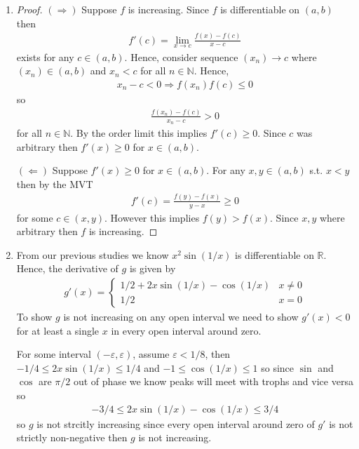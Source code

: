 \begin{enumerate}[label=(\alph*)]
    \item 
    \begin{proof}
        $(\Rightarrow)$ Suppose $f$ is increasing. 
        Since $f$ is differentiable on $(a,b)$ then 
        \begin{align*}
            f'(c) = \lim_{x\rightarrow c} \frac{f(x)-f(c)}{x-c}
        \end{align*}
        exists for any $c\in (a,b)$.
        Hence, consider sequence $(x_n)\rightarrow c$ where 
        $(x_n)\in (a,b)$ and $x_n<c$ for all $n\in \mathbb{N}$.
        Hence, 
        \begin{align*}
            x_n - c < 0 \Rightarrow f(x_n) f(c) \leq 0
        \end{align*}
        so 
        \begin{align*}
            \frac{f(x_n)-f(c)}{x_n-c} > 0
        \end{align*}
        for all $n\in \mathbb{N}$.
        By the order limit \Thm this implies $f'(c)\geq 0$.
        Since $c$ was arbitrary then $f'(x)\geq 0$ for $x\in(a,b)$.
    
        $(\Leftarrow)$ Suppose $f'(x)\geq 0$ for $x\in (a,b)$.
        For any $x,y\in (a,b)$ s.t. $x<y$ then by the MVT
        \begin{align*}
            f'(c) = \frac{f(y)-f(x)}{y-x} \geq 0
        \end{align*}
        for some $c\in (x,y)$.
        However this implies $f(y)>f(x)$. Since $x,y$ where 
        arbitrary then $f$ is increasing.
    \end{proof}

    \item
    From our previous studies we know $x^2 \sin(1/x)$ is
    differentiable on $\mathbb{R}$. Hence, the derivative of 
    $g$ is given by
    \begin{align*}
        g'(x) = \begin{cases}
            1/2 + 2x \sin(1/x) - \cos(1/x) & x\neq 0 \\
            1/2 & x=0
        \end{cases}
    \end{align*}
    To show $g$ is not increasing on any open interval we need to show 
    $g'(x)<0$ for at least a single $x$ in every open interval around zero.
    
    For some interval $(-\varepsilon, \varepsilon)$, assume $\varepsilon<1/8$,
    then $-1/4 \leq 2x\sin(1/x) \leq 1/4$ and $-1 \leq \cos(1/x) \leq 1$ so 
    since $\sin$ and $\cos$ are $\pi/2$ out of phase we know peaks will meet 
    with trophs and vice versa so
    \begin{align*}
        -3/4 \leq 2x\sin(1/x) - \cos(1/x) \leq 3/4
    \end{align*}
    so $g$ is not strcitly increasing since every open interval around zero of
    $g'$ is not strictly non-negative then $g$ is not increasing. 
\end{enumerate}

